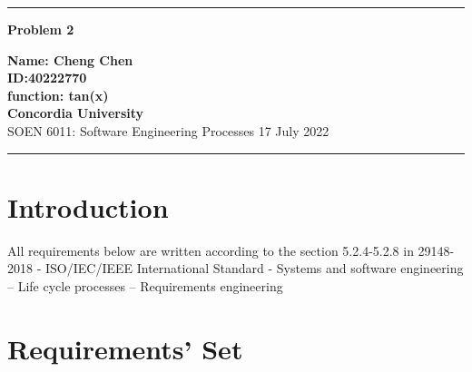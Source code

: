 \documentclass[10pt,a4paper,twoside]{article}
\begin{document}
\begin{center}
\hrule

\vspace{.4cm}
{\bf {\Huge Problem 2}}
\vspace{.2cm}
\end{center}
{\bf Name: Cheng Chen}  \\
{\bf ID:40222770}\\
{\bf function: tan(x)}\\
{\bf Concordia University}\\
SOEN 6011: Software Engineering Processes {\bf  } \hspace{\fill}  17 July  2022 \\
\hrule






\section{Introduction}
    All requirements below are written according to the section 5.2.4-5.2.8 in 29148-2018 - ISO/IEC/IEEE International Standard - Systems and software engineering -- Life cycle processes -- Requirements engineering\cite{8559686}
\section{Requirements' Set}
\end{document}
